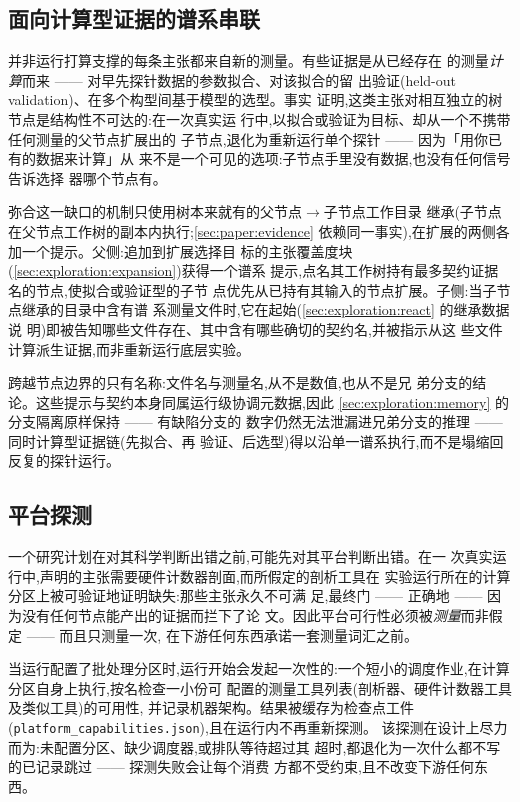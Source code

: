 \subsection{面向计算型证据的谱系串联}\label{sec:exploration:lineage-chaining}

并非运行打算支撑的每条主张都来自新的测量。有些证据是从已经存在
的测量\emph{计算}而来 —— 对早先探针数据的参数拟合、对该拟合的留
出验证(held-out validation)、在多个构型间基于模型的选型。事实
证明,这类主张对相互独立的树节点是结构性不可达的:在一次真实运
行中,以拟合或验证为目标、却从一个不携带任何测量的父节点扩展出的
子节点,退化为重新运行单个探针 —— 因为「用你已有的数据来计算」从
来不是一个可见的选项:子节点手里没有数据,也没有任何信号告诉选择
器哪个节点有。

弥合这一缺口的机制只使用树本来就有的父节点$\to$子节点工作目录
继承(子节点在父节点工作树的副本内执行;\cref{sec:paper:evidence}
依赖同一事实),在扩展的两侧各加一个提示。父侧:追加到扩展选择目
标的主张覆盖度块(\cref{sec:exploration:expansion})获得一个谱系
提示,点名其工作树持有最多契约证据名的节点,使拟合或验证型的子节
点优先从已持有其输入的节点扩展。子侧:当子节点继承的目录中含有谱
系测量文件时,它在起始(\cref{sec:exploration:react} 的继承数据说
明)即被告知哪些文件存在、其中含有哪些确切的契约名,并被指示从这
些文件计算派生证据,而非重新运行底层实验。

跨越节点边界的只有名称:文件名与测量名,从不是数值,也从不是兄
弟分支的结论。这些提示与契约本身同属运行级协调元数据,因此
\cref{sec:exploration:memory} 的分支隔离原样保持 —— 有缺陷分支的
数字仍然无法泄漏进兄弟分支的推理 —— 同时计算型证据链(先拟合、再
验证、后选型)得以沿单一谱系执行,而不是塌缩回反复的探针运行。

\subsection{平台探测}\label{sec:exploration:platform-probe}

一个研究计划在对其科学判断出错之前,可能先对其平台判断出错。在一
次真实运行中,声明的主张需要硬件计数器剖面,而所假定的剖析工具在
实验运行所在的计算分区上被可验证地证明缺失:那些主张永久不可满
足,最终门 —— 正确地 —— 因为没有任何节点能产出的证据而拦下了论
文。因此平台可行性必须被\emph{测量}而非假定 —— 而且只测量一次,
在下游任何东西承诺一套测量词汇之前。

当运行配置了批处理分区时,运行开始会发起一次性的:一个短小的调度作业,在计算分区自身上执行,按名检查一小份可
配置的测量工具列表(剖析器、硬件计数器工具及类似工具)的可用性,
并记录机器架构。结果被缓存为检查点工件
(\texttt{platform\_capabilities.json}),且在运行内不再重新探测。
该探测在设计上尽力而为:未配置分区、缺少调度器,或排队等待超过其
超时,都退化为一次什么都不写的已记录跳过 —— 探测失败会让每个消费
方都不受约束,且不改变下游任何东西。

